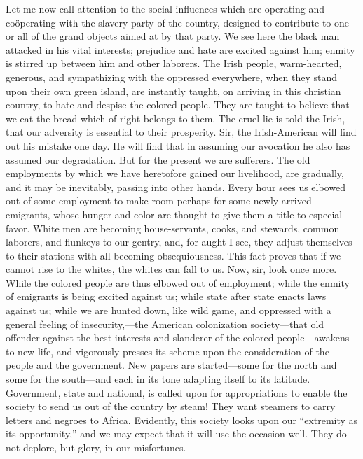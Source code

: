 Let me now call attention to the social influences which are operating
and coöperating with the slavery party of the country, designed to
contribute to one or all of the grand objects aimed at by that party. We
see here the black man attacked in his vital interests; prejudice and
hate are excited against him; enmity is stirred up between him and other
laborers. The Irish people, warm-hearted, generous, and sympathizing
with the oppressed everywhere, when they stand upon their own green
island, are instantly taught, on arriving in this christian country, to
hate and despise the colored people. They are taught to believe that we
eat the bread which of right belongs to them. The cruel lie is told the
Irish, that our adversity is essential to their prosperity. Sir, the
Irish-American will find out his mistake one day. He will find that in
assuming our avocation he also has assumed our degradation. But for the
present we are sufferers. The old employments by which we have
heretofore gained our livelihood, are gradually, and it may be
inevitably, passing into other hands. Every hour sees us elbowed out of
some employment to make room perhaps for some newly-arrived emigrants,
whose hunger and color are thought to give them a title to especial
favor. White men are becoming house-servants, cooks, and stewards,
common laborers, and flunkeys to our gentry, and, for aught I see, they
adjust themselves to their stations with all becoming obsequiousness.
This fact proves that if we cannot rise to the whites, the whites can
fall to us. Now, sir, look once more. While the colored people are thus
{}elbowed out of employment; while the enmity of emigrants is being
excited against us; while state after state enacts laws against us;
while we are hunted down, like wild game, and oppressed with a general
feeling of insecurity,---the American colonization society---that old
offender against the best interests and slanderer of the colored
people---awakens to new life, and vigorously presses its scheme upon the
consideration of the people and the government. New papers are
started---some for the north and some for the south---and each in its
tone adapting itself to its latitude. Government, state and national, is
called upon for appropriations to enable the society to send us out of
the country by steam! They want steamers to carry letters and negroes to
Africa. Evidently, this society looks upon our ``extremity as its
opportunity,'' and we may expect that it will use the occasion well.
They do not deplore, but glory, in our misfortunes.

